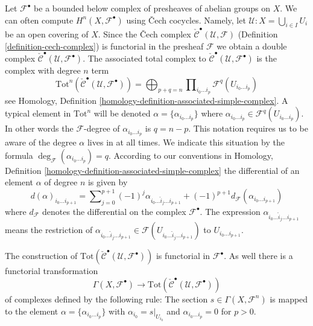 \medskip\noindent
Let ${\mathcal F}^\bullet$ be a bounded below complex of presheaves of abelian
groups on $X$. We can often compute $H^n(X, {\mathcal F}^\bullet)$
using {\v C}ech cocycles. Namely, let
${\mathcal U} : X = \bigcup_{i \in I} U_i$
be an open covering of $X$. Since the {\v C}ech complex
$\check{\mathcal{C}}^\bullet(\mathcal{U}, \mathcal{F})$
(Definition \ref{definition-cech-complex})
is functorial in the presheaf $\mathcal{F}$ we obtain a double complex
$\check{\mathcal{C}}^\bullet(\mathcal{U}, \mathcal{F}^\bullet)$.
The associated total complex to
$\check{\mathcal{C}}^\bullet({\mathcal U}, {\mathcal F}^\bullet)$
is the complex with degree $n$ term
$$
\text{Tot}^n(\check{\mathcal{C}}^\bullet({\mathcal U}, {\mathcal F}^\bullet))
=
\bigoplus\nolimits_{p + q = n}
\prod\nolimits_{i_0\ldots i_p} {\mathcal F}^q(U_{i_0\ldots i_p})
$$
see
Homology, Definition \ref{homology-definition-associated-simple-complex}.
A typical element in $\text{Tot}^n$ will be denoted
$\alpha = \{\alpha_{i_0\ldots i_p}\}$ where
$\alpha_{i_0 \ldots i_p} \in \mathcal{F}^q(U_{i_0\ldots i_p})$.
In other words the $\mathcal{F}$-degree of $\alpha_{i_0\ldots i_p}$ is
$q = n - p$. This notation requires us to be aware of the degree $\alpha$
lives in at all times. We indicate this situation by the formula
$\deg_{\mathcal F}(\alpha_{i_0\ldots i_p}) = q$.
According to our conventions in
Homology, Definition \ref{homology-definition-associated-simple-complex}
the differential of an element $\alpha$ of degree $n$ is given by
$$
d(\alpha)_{i_0\ldots i_{p + 1}}
=
\sum\nolimits_{j = 0}^{p + 1}
(-1)^j \alpha_{i_0 \ldots \hat i_j \ldots i_{p + 1}} + 
(-1)^{p + 1}d_{{\mathcal F}}(\alpha_{i_0 \ldots i_{p + 1}})
$$
where $d_\mathcal{F}$ denotes the differential on the complex
$\mathcal{F}^\bullet$.
The expression $\alpha_{i_0 \ldots \hat i_j \ldots i_{p + 1}}$ means the
restriction of $\alpha_{i_0 \ldots \hat i_j \ldots i_{p + 1}}
\in {\mathcal F}(U_{i_0\ldots\hat i_j\ldots i_{p + 1}})$ to
$U_{i_0 \ldots i_{p + 1}}$.

\medskip\noindent
The construction of
$\text{Tot}(\check{\mathcal{C}}^\bullet({\mathcal U}, {\mathcal F}^\bullet))$
is functorial in ${\mathcal F}^\bullet$. As well there is a functorial
transformation
\begin{equation}
\label{equation-global-sections-to-cech}
\Gamma(X, {\mathcal F}^\bullet)
\longrightarrow
\text{Tot}(\check{\mathcal{C}}^\bullet({\mathcal U}, {\mathcal F}^\bullet))
\end{equation}
of complexes defined by the following rule: The section
$s\in \Gamma(X, {\mathcal F}^n)$
is mapped to the element $\alpha = \{\alpha_{i_0\ldots i_p}\}$
with $\alpha_{i_0} = s|_{U_{i_0}}$ and $\alpha_{i_0\ldots i_p} = 0$
for $p > 0$.

